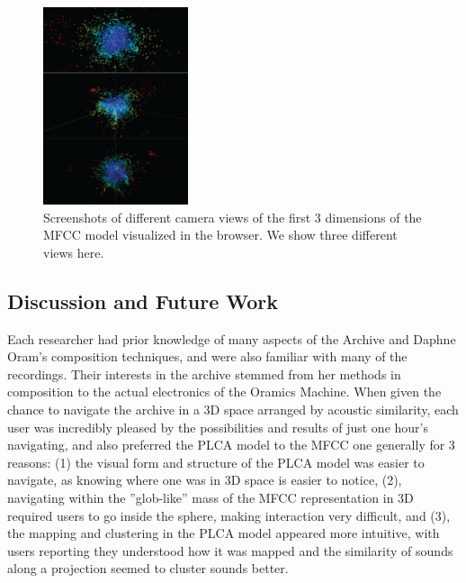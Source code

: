 \documentclass[a4paper,10pt,final]{ThesisStyle}
\begin{document}
\begin{figure}
  \centering
 \includegraphics[width=0.38\textwidth]{images/mfcc-all.png}
  \caption{Screenshots of different camera views of the first 3 dimensions of the MFCC model visualized in the browser.  We show three different views here.}
  \label{fig:mfcc}
\end{figure}



\subsection{Discussion and Future Work}\label{discussion}

Each researcher had prior knowledge of many aspects of the Archive and Daphne Oram's composition techniques, and were also familiar with many of the recordings.  Their interests in the archive stemmed from her methods in composition to the actual electronics of the Oramics Machine.  When given the chance to navigate the archive in a 3D space arranged by acoustic similarity, each user was incredibly pleased by the possibilities and results of just one hour's navigating, and also preferred the PLCA model to the MFCC one generally for 3 reasons: (1) the visual form and structure of the PLCA model was easier to navigate, as knowing where one was in 3D space is easier to notice, (2), navigating within the ''glob-like'' mass of the MFCC representation in 3D required users to go inside the sphere, making interaction very difficult, and (3), the mapping and clustering in the PLCA model appeared more intuitive, with users reporting they understood how it was mapped and the similarity of sounds along a projection seemed to cluster sounds better.  
\end{document}
